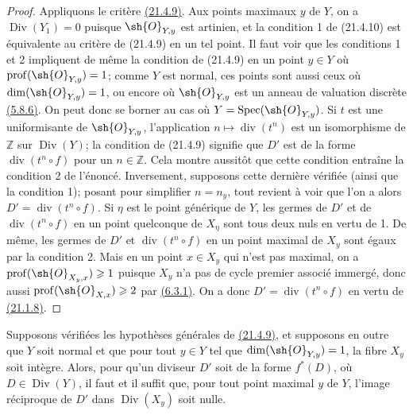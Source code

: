 \begin{proof}
Appliquons le critère {\hyperlink{ega4.c04.prop.21-4-9}{(21.4.9)}}.
Aux points maximaux $y$ de $Y$, on a $\operatorname{Div}(Y_1)=0$
puisque $\sh{O}_{Y,y}$ est artinien, et la condition 1\textdegree{} de
(21.4.10) est équivalente au critère de (21.4.9) en un tel point. Il
faut voir que les conditions 1\textdegree{} et 2\textdegree{} impliquent
de même la condition de (21.4.9) en un point $y\in Y$ où
$\operatorname{prof}(\sh{O}_{Y,y})=1$; comme $Y$ est normal, ces points
sont aussi ceux où $\dim(\sh{O}_{Y,y})=1$, ou encore où
$\sh{O}_{Y,y}$ est un anneau de valuation discrète
{\hyperref[canon-index.ega4.c04.thm.5-8-6]{(5.8.6)}}. On peut donc se borner au
cas où $Y=\operatorname{Spec}(\sh{O}_{Y,y})$. Si $t$ est une
uniformisante de $\sh{O}_{Y,y}$, l'application
$n\mapsto\operatorname{div}(t^n)$ est un isomorphisme de $\mathbb Z$
sur $\operatorname{Div}(Y)$; la condition de (21.4.9) signifie que
$D'$ est de la forme $\operatorname{div}(t^n\circ f)$ pour un
$n\in\mathbb Z$. Cela montre aussitôt que cette condition entraîne la
condition 2\textdegree{} de l'énoncé. Inversement, supposons cette
dernière vérifiée (ainsi que la condition 1\textdegree{}); posant pour
simplifier $n=n_y$, tout revient à voir que l'on a alors
$D'=\operatorname{div}(t^n\circ f)$. Si $\eta$ est le point générique
de $Y$, les germes de $D'$ et de $\operatorname{div}(t^n\circ f)$ en
un point quelconque de $X_\eta$ sont tous deux nuls en vertu de
1\textdegree{}. De même, les germes de $D'$ et
$\operatorname{div}(t^n\circ f)$ en un point maximal de $X_y$ sont
égaux par la condition 2\textdegree{}. Mais en un point $x\in X_y$ qui
n'est pas maximal, on a
$\operatorname{prof}(\sh{O}_{X_y,x})\geq1$ puisque $X_y$ n'a pas de
cycle premier associé immergé, donc aussi
$\operatorname{prof}(\sh{O}_{X,x})\geq2$ par
{\hyperref[canon-index.ega4.c04.prop.6-3-1]{(6.3.1)}}. On a donc
$D'=\operatorname{div}(t^n\circ f)$ en vertu de
{\hyperlink{ega4.c04.prop.21-1-8}{(21.1.8)}}.
\end{proof}

\begin{corollary}[21.4.11]
Supposons vérifiées les hypothèses générales de
{\hyperlink{ega4.c04.prop.21-4-9}{(21.4.9)}}, et supposons en outre que
$Y$ soit normal et que pour tout $y\in Y$ tel que
$\dim(\sh{O}_{Y,y})=1$, la fibre $X_y$ soit intègre. Alors, pour qu'un
diviseur $D'$ soit de la forme $f^*(D)$, où
$D\in\operatorname{Div}(Y)$, il faut et il suffit que, pour tout point
maximal $y$ de $Y$, l'image réciproque de $D'$ dans
$\operatorname{Div}(X_y)$ soit nulle.
\end{corollary}


